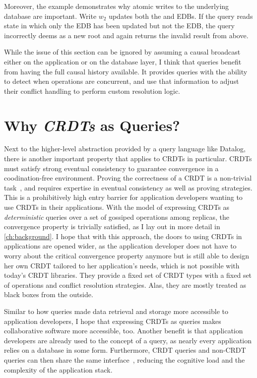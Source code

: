Moreover, the example demonstrates why atomic writes to the underlying database
are important.
Write \(w_2\) updates both the  and  EDBs.
If the query reads state in which only the  EDB has been updated
but not the  EDB,
the query incorrectly deems  as a new root and
again returns the invalid result from above.

While the issue of this section can be ignored by assuming a causal broadcast
either on the application or on the database layer,
I think that queries benefit from having the full causal history available.
It provides queries with the ability to detect when operations are concurrent,
and use that information to adjust their conflict handling to perform
custom resolution logic.

\section{Why \emph{\acp{CRDT}} as Queries?}

Next to the higher-level abstraction provided by a query language like Datalog,
there is another important property that applies to \acp{CRDT} in particular.
\acp{CRDT} must satisfy strong eventual consistency to guarantee convergence
in a coodination-free environment.
Proving the correctness of a \ac{CRDT} is a non-trivial
task~\cite{gomes2017verifying, kleppmann2022assessing},
and requires expertise in eventual consistency as well as proving strategies.
This is a prohibitively high entry barrier for application developers
wanting to use \acp{CRDT} in their applications.
With the model of expressing \acp{CRDT} as \emph{deterministic} queries over a
set of gossiped operations among replicas, the convergence property is trivially
satisfied, as I lay out in more detail in \autoref{ch:background}.
I hope that with this approach, the doors to using \acp{CRDT} in applications
are opened wider, as the application developer does not have to worry about
the critical convergence property anymore but is still able to design her own
\ac{CRDT} tailored to her application's needs, which is not possible with
today's \ac{CRDT} libraries.
They provide a fixed set of \ac{CRDT} types with a fixed set of operations
and conflict resolution strategies.
Alas, they are mostly treated as black boxes from the outside.

Similar to how queries made data retrieval and storage more accessible to
application developers, I hope that expressing \acp{CRDT} as queries
makes collaborative software more accessible, too.
Another benefit is that application developers are already used to the concept
of a query, as nearly every application relies on a database in some form.
Furthermore, \ac{CRDT} queries and non-\ac{CRDT} queries can then share the
same interface~\cite{litt2023riffle}, reducing the cognitive load and the
complexity of the application stack.


